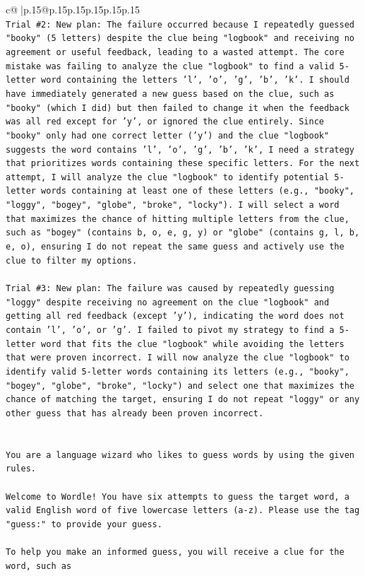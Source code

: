 \documentclass{article}
\begin{document}
{\begin{supertabular}{c@{$\;$}|p{.15\linewidth}@{}p{.15\linewidth}p{.15\linewidth}p{.15\linewidth}p{.15\linewidth}p{.15\linewidth}}
{{{\\ 
\texttt{Trial \#2: New plan: The failure occurred because I repeatedly guessed "booky" (5 letters) despite the clue being "logbook" and receiving no agreement or useful feedback, leading to a wasted attempt. The core mistake was failing to analyze the clue "logbook" to find a valid 5{-}letter word containing the letters 'l', 'o', 'g', 'b', 'k'. I should have immediately generated a new guess based on the clue, such as "booky" (which I did) but then failed to change it when the feedback was all red except for 'y', or ignored the clue entirely. Since "booky" only had one correct letter ('y') and the clue "logbook" suggests the word contains 'l', 'o', 'g', 'b', 'k', I need a strategy that prioritizes words containing these specific letters. For the next attempt, I will analyze the clue "logbook" to identify potential 5{-}letter words containing at least one of these letters (e.g., "booky", "loggy", "bogey", "globe", "broke", "locky"). I will select a word that maximizes the chance of hitting multiple letters from the clue, such as "bogey" (contains b, o, e, g, y) or "globe" (contains g, l, b, e, o), ensuring I do not repeat the same guess and actively use the clue to filter my options.} \\
\\ 
\texttt{Trial \#3: New plan: The failure was caused by repeatedly guessing "loggy" despite receiving no agreement on the clue "logbook" and getting all red feedback (except 'y'), indicating the word does not contain 'l', 'o', or 'g'. I failed to pivot my strategy to find a 5{-}letter word that fits the clue "logbook" while avoiding the letters that were proven incorrect. I will now analyze the clue "logbook" to identify valid 5{-}letter words containing its letters (e.g., "booky", "bogey", "globe", "broke", "locky") and select one that maximizes the chance of matching the target, ensuring I do not repeat "loggy" or any other guess that has already been proven incorrect.} \\
\\ 
\\ 
\texttt{You are a language wizard who likes to guess words by using the given rules.} \\
\\ 
\texttt{Welcome to Wordle! You have six attempts to guess the target word, a valid English word of five lowercase letters (a{-}z). Please use the tag "guess:" to provide your guess.} \\
\\ 
\texttt{To help you make an informed guess, you will receive a clue for the word, such as} \\
}}}
\end{supertabular}}
\end{document}
